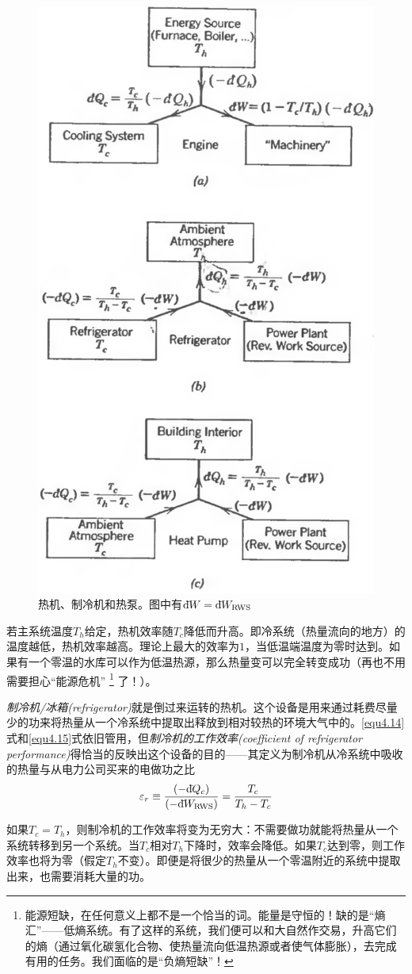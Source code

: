 \begin{figure}
\centering
\includegraphics[width=.5\textwidth]{Pictures/fig4.6.png}
\caption{热机、制冷机和热泵。图中有$\mathrm d\hspace*{-0.1em}\bar{}\hspace*{0.08em} W=\mathrm d\hspace*{-0.1em}\bar{}\hspace*{0.08em} W_{\text{RWS}}$}
\label{fig4.6}
\end{figure}

若主系统温度$T_h$给定，热机效率随$T_c$降低而升高。即冷系统（热量流向的地方）的温度越低，热机效率越高。理论上最大的效率为$1$，当低温端温度为零时达到。如果有一个零温的水库可以作为低温热源，那么热量变可以完全转变成功（再也不用需要担心“能源危机”%
\footnote{能源短缺，在任何意义上都不是一个恰当的词。能量是守恒的！缺的是“熵汇”——低熵系统。有了这样的系统，我们便可以和大自然作交易，升高它们的熵（通过氧化碳氢化合物、使热量流向低温热源或者使气体膨胀），去完成有用的任务。我们面临的是“负熵短缺”！}%
%
了！）。

{\it 制冷机/冰箱(refrigerator)}就是倒过来运转的热机。这个设备是用来通过耗费尽量少的功来将热量从一个冷系统中提取出释放到相对较热的环境大气中的。\eqref{equ4.14}式和\eqref{equ4.15}式依旧管用，但{\it 制冷机的工作效率(coefficient of refrigerator performance)}得恰当的反映出这个设备的目的——其定义为制冷机从冷系统中吸收的热量与从电力公司买来的电做功之比
\begin{equation}
\varepsilon_r \equiv \frac{(-\mathrm d\hspace*{-0.1em}\bar{}\hspace*{0.08em} Q_c)}{(-\mathrm d\hspace*{-0.1em}\bar{}\hspace*{0.08em} W_\text{\text{RWS}})} = \frac{T_c}{T_h-T_c}
\end{equation}

如果$T_c=T_h$，则制冷机的工作效率将变为无穷大：不需要做功就能将热量从一个系统转移到另一个系统。当$T_c$相对$T_h$下降时，效率会降低。如果$T_c$达到零，则工作效率也将为零（假定$T_h$不变）。即便是将很少的热量从一个零温附近的系统中提取出来，也需要消耗大量的功。

